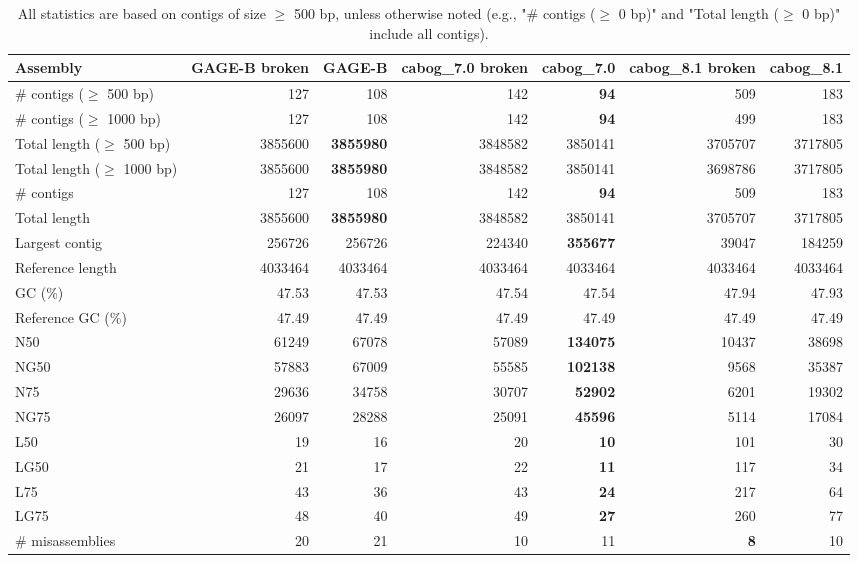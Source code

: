 \documentclass[12pt,a4paper]{article}
\begin{document}
\begin{table}[ht]
\begin{center}
\caption{All statistics are based on contigs of size $\geq$ 500 bp, unless otherwise noted (e.g., "\# contigs ($\geq$ 0 bp)" and "Total length ($\geq$ 0 bp)" include all contigs).}
\begin{tabular}{|l*{6}{|r}|}
\hline
Assembly & GAGE-B broken & GAGE-B & cabog\_7.0 broken & cabog\_7.0 & cabog\_8.1 broken & cabog\_8.1 \\ \hline
\# contigs ($\geq$ 500 bp) & 127 & 108 & 142 & {\bf 94} & 509 & 183 \\ \hline
\# contigs ($\geq$ 1000 bp) & 127 & 108 & 142 & {\bf 94} & 499 & 183 \\ \hline
Total length ($\geq$ 500 bp) & 3855600 & {\bf 3855980} & 3848582 & 3850141 & 3705707 & 3717805 \\ \hline
Total length ($\geq$ 1000 bp) & 3855600 & {\bf 3855980} & 3848582 & 3850141 & 3698786 & 3717805 \\ \hline
\# contigs & 127 & 108 & 142 & {\bf 94} & 509 & 183 \\ \hline
Total length & 3855600 & {\bf 3855980} & 3848582 & 3850141 & 3705707 & 3717805 \\ \hline
Largest contig & 256726 & 256726 & 224340 & {\bf 355677} & 39047 & 184259 \\ \hline
Reference length & 4033464 & 4033464 & 4033464 & 4033464 & 4033464 & 4033464 \\ \hline
GC (\%) & 47.53 & 47.53 & 47.54 & 47.54 & 47.94 & 47.93 \\ \hline
Reference GC (\%) & 47.49 & 47.49 & 47.49 & 47.49 & 47.49 & 47.49 \\ \hline
N50 & 61249 & 67078 & 57089 & {\bf 134075} & 10437 & 38698 \\ \hline
NG50 & 57883 & 67009 & 55585 & {\bf 102138} & 9568 & 35387 \\ \hline
N75 & 29636 & 34758 & 30707 & {\bf 52902} & 6201 & 19302 \\ \hline
NG75 & 26097 & 28288 & 25091 & {\bf 45596} & 5114 & 17084 \\ \hline
L50 & 19 & 16 & 20 & {\bf 10} & 101 & 30 \\ \hline
LG50 & 21 & 17 & 22 & {\bf 11} & 117 & 34 \\ \hline
L75 & 43 & 36 & 43 & {\bf 24} & 217 & 64 \\ \hline
LG75 & 48 & 40 & 49 & {\bf 27} & 260 & 77 \\ \hline
\# misassemblies & 20 & 21 & 10 & 11 & {\bf 8} & 10 \\ \hline

\end{tabular}
\end{center}
\end{table}
\end{document}
